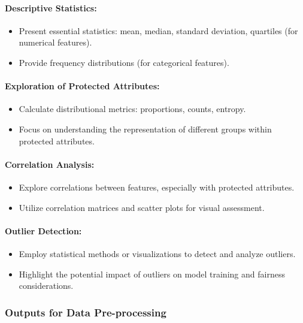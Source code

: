 \paragraph{Descriptive Statistics:}
\begin{itemize}
    \item Present essential statistics: mean, median, standard deviation, quartiles (for numerical features).
    \item Provide frequency distributions (for categorical features).
\end{itemize}

\paragraph{Exploration of Protected Attributes:}
\begin{itemize}
    \item Calculate distributional metrics: proportions, counts, entropy.
    \item Focus on understanding the representation of different groups within protected attributes.
\end{itemize}

\paragraph{Correlation Analysis:}
\begin{itemize}
    \item Explore correlations between features, especially with protected attributes.
    \item Utilize correlation matrices and scatter plots for visual assessment.
\end{itemize}

\paragraph{Outlier Detection:}
\begin{itemize}
    \item Employ statistical methods or visualizations to detect and analyze outliers.
    \item Highlight the potential impact of outliers on model training and fairness considerations.
\end{itemize}

\subsubsection{Outputs for Data Pre-processing}

